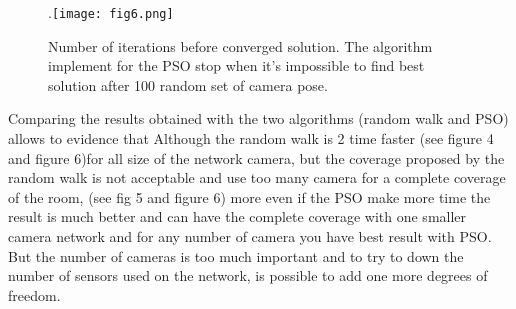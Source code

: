 \begin{figure}
  \centering
  \hspace*{\fill}
	.\texttt{[image: fig6.png]}
  \hspace*{\fill}
  \caption{%
	 Number of iterations before converged solution.  The algorithm implement for the PSO stop when it’s impossible to find best solution after 100 random set of camera pose.}
  \label{fig:422}
\end{figure}
Comparing the results obtained with the two algorithms (random walk and PSO) allows to evidence that Although the random walk is 2 time faster (see figure 4 and figure 6)for all size of the network camera, but the coverage proposed by the random walk is not acceptable and use too many camera for a complete coverage of the room, (see fig 5 and figure 6) more even if the PSO make more time the result is much better and can have the complete coverage with one smaller camera network and for any number of camera you have best result with PSO.
But the number of cameras is too much important and to try to down the number of sensors used on the network, is possible to add one more degrees of freedom. 




